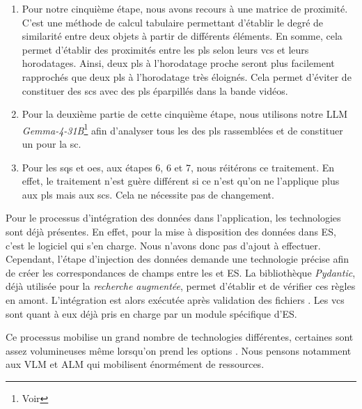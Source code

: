 \begin{enumerate}
	\subitem Ou l'utilisation de \gls{mmlts} comme CLIP\footnote{} capable d'analyser aussi bien le son que la vidéo. Contrairement aux processus précédents, les \gls{vcs} générés par CLIP à partir des vidéos et sons et non d'analyse textuelle précédemment générées.
	
	\item Pour notre cinquième étape, nous avons recours à une matrice de proximité. C'est une méthode de calcul tabulaire permettant d'établir le degré de similarité entre deux objets à partir de différents éléments. En somme, cela permet d'établir des proximités entre les \glspl{pl} selon leurs \gls{vcs} et leurs horodatages. Ainsi, deux \glspl{pl} à l'horodatage proche seront plus facilement rapprochés que deux \glspl{pl} à l'horodatage très éloignés. Cela permet d'éviter de constituer des \glspl{sc} avec des \glspl{pl} éparpillés dans la bande vidéos.
	
	\item Pour la deuxième partie de cette cinquième étape, nous utilisons notre \gls{LLM} \textit{Gemma-4-31B}\footnote{Voir } afin d'analyser tous les \J des \glspl{pl} rassemblées et de constituer un \J pour la \gls{sc}.
	
	\item Pour les \glspl{sq} et \glspl{oe}, aux étapes 6, 6  et 7, nous réitérons ce traitement. En effet, le traitement n'est guère différent si ce n'est qu'on ne l'applique plus aux \glspl{pl} mais aux \glspl{sc}. Cela ne nécessite pas de changement. 
\end{enumerate}

Pour le processus d'intégration des données dans l'application, les technologies sont déjà présentes. En effet, pour la mise à disposition des données dans \gls{ES}, c'est le logiciel qui s'en charge. Nous n'avons donc pas d'ajout à effectuer. Cependant, l'étape d'injection des données demande une technologie précise afin de créer les correspondances de champs entre les \J et \gls{ES}. La bibliothèque \textit{Pydantic}, déjà utilisée pour la \textit{recherche augmentée}, permet d'établir et de vérifier ces règles en amont. L'intégration est alors exécutée après validation des fichiers \J. Les \gls{vcs} sont quant à eux déjà pris en charge par un module spécifique d'\gls{ES}.\newline

Ce processus mobilise un grand nombre de technologies différentes, certaines sont assez volumineuses même lorsqu'on prend les options . Nous pensons notamment aux \gls{VLM} et \gls{ALM} qui mobilisent énormément de ressources.  

